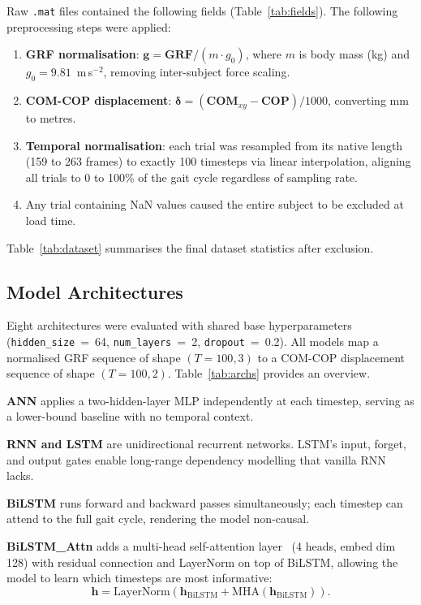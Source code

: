 \documentclass[preprint,12pt]{elsarticle}
\begin{document}
Raw \texttt{.mat} files contained the following fields (Table~\ref{tab:fields}).
The following preprocessing steps were applied:
\begin{enumerate}
  \item \textbf{GRF normalisation}: $\mathbf{g} = \mathbf{GRF} / (m \cdot g_0)$,
        where $m$ is body mass (kg) and $g_0 = 9.81$~m\,s$^{-2}$, removing
        inter-subject force scaling.
  \item \textbf{COM-COP displacement}: $\boldsymbol{\delta} =
        (\mathbf{COM}_{xy} - \mathbf{COP}) / 1000$, converting mm to metres.
  \item \textbf{Temporal normalisation}: each trial was resampled from its native
        length (159 to 263 frames) to exactly 100 timesteps via linear interpolation,
        aligning all trials to 0 to 100\% of the gait cycle regardless of sampling
        rate.
  \item Any trial containing NaN values caused the entire subject to be excluded
        at load time.
\end{enumerate}

Table~\ref{tab:dataset} summarises the final dataset statistics after exclusion.

\subsection{Model Architectures}
\label{subsec:archs}

Eight architectures were evaluated with shared base hyperparameters
(\texttt{hidden\_size}~=~64, \texttt{num\_layers}~=~2, \texttt{dropout}~=~0.2).
All models map a normalised GRF sequence of shape $(T=100, 3)$ to a COM-COP
displacement sequence of shape $(T=100, 2)$.
Table~\ref{tab:archs} provides an overview.

\noindent\textbf{ANN} applies a two-hidden-layer MLP independently at each
timestep, serving as a lower-bound baseline with no temporal context.

\noindent\textbf{RNN and LSTM} are unidirectional recurrent networks.
LSTM's input, forget, and output gates enable long-range dependency modelling that
vanilla RNN lacks.

\noindent\textbf{BiLSTM} runs forward and backward passes simultaneously; each
timestep can attend to the full gait cycle, rendering the model non-causal.

\noindent\textbf{BiLSTM\_Attn} adds a multi-head self-attention layer~\cite{vaswani2017attention}
(4 heads, embed dim 128) with residual connection and LayerNorm on top of BiLSTM,
allowing the model to learn which timesteps are most informative:
\begin{equation}
  \mathbf{h} = \mathrm{LayerNorm}\!\left(\mathbf{h}_\mathrm{BiLSTM}
              + \mathrm{MHA}(\mathbf{h}_\mathrm{BiLSTM})\right).
\end{equation}
\end{document}
